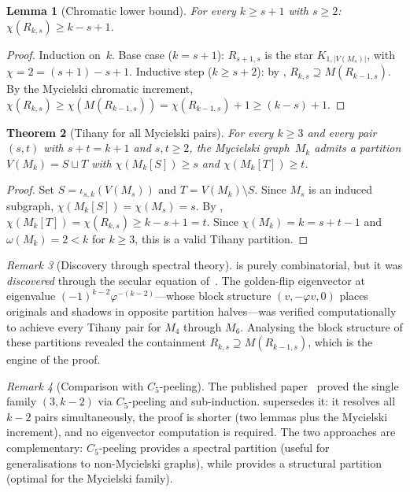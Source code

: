 \documentclass[11pt]{amsart}
\newtheorem{theorem}{Theorem}[section]
\newtheorem{lemma}[theorem]{Lemma}
\theoremstyle{definition}
\theoremstyle{remark}
\newtheorem{remark}[theorem]{Remark}
\newcommand{\vphi}{\varphi}
\begin{document}
\begin{lemma}[Chromatic lower bound]\label{lem:chromatic}
For every $k \ge s + 1$ with $s \ge 2$: $\chi(R_{k,s}) \ge k - s + 1$.
\end{lemma}

\begin{proof}
Induction on~$k$.  Base case ($k = s+1$): $R_{s+1,s}$ is the star 
$K_{1,|V(M_s)|}$, with $\chi = 2 = (s+1) - s + 1$.  Inductive step 
($k \ge s+2$): by , $R_{k,s} \supseteq M(R_{k-1,s})$.  
By the Mycielski chromatic increment, 
$\chi(R_{k,s}) \ge \chi(M(R_{k-1,s})) = \chi(R_{k-1,s}) + 1 \ge (k-s) + 1$.
\end{proof}

\begin{theorem}[Tihany for all Mycielski pairs]\label{thm:tihany-mycielski}
For every $k \ge 3$ and every pair $(s,t)$ with $s + t = k + 1$ and 
$s, t \ge 2$, the Mycielski graph~$M_k$ admits a partition 
$V(M_k) = S \sqcup T$ with $\chi(M_k[S]) \ge s$ and $\chi(M_k[T]) \ge t$.
\end{theorem}

\begin{proof}
Set $S = \iota_{s,k}(V(M_s))$ and $T = V(M_k) \setminus S$.  
Since $M_s$ is an induced subgraph, $\chi(M_k[S]) = \chi(M_s) = s$.  
By , $\chi(M_k[T]) = \chi(R_{k,s}) \ge k - s + 1 = t$.  
Since $\chi(M_k) = k = s + t - 1$ and $\omega(M_k) = 2 < k$ for 
$k \ge 3$, this is a valid Tihany partition.
\end{proof}

\begin{remark}[Discovery through spectral theory]\label{rmk:discovery}
 is purely combinatorial, but it was 
\emph{discovered} through the secular equation 
of~\cite{santos-grt-2026}.  The golden-flip eigenvector at eigenvalue 
$(-1)^{k-2}\vphi^{-(k-2)}$---whose block structure 
$(v, -\vphi v, 0)$ places originals and shadows in opposite 
partition halves---was verified computationally to achieve every 
Tihany pair for $M_4$ through $M_6$.  Analysing the block structure 
of these partitions revealed the containment 
$R_{k,s} \supseteq M(R_{k-1,s})$, which is the engine of the proof.
\end{remark}

\begin{remark}[Comparison with $C_5$-peeling]\label{rmk:c5-peeling}
The published paper~\cite{santos-golden-2026} proved the single family 
$(3, k{-}2)$ via $C_5$-peeling and sub-induction.  
 supersedes it: it resolves all $k-2$ 
pairs simultaneously, the proof is shorter (two lemmas plus the 
Mycielski increment), and no eigenvector computation is required.  
The two approaches are complementary: $C_5$-peeling provides a 
spectral partition (useful for generalisations to non-Mycielski graphs), 
while  provides a structural partition 
(optimal for the Mycielski family).
\end{remark}
\end{document}
